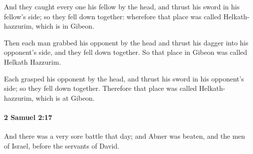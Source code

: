 			\begin{versebox}
					\item[BHS] 
					\item[ASV] And they caught every one his fellow by the head, and thrust his sword in his fellow's side; so they fell down together: wherefore that place was called Helkath-hazzurim, which is in Gibeon.
					\item[NIV] Then each man grabbed his opponent by the head and thrust his dagger into his opponent’s side, and they fell down together. So that place in Gibeon was called Helkath Hazzurim.
					\item[NRSV] Each grasped his opponent by the head, and thrust his sword in his opponent’s side; so they fell down together. Therefore that place was called Helkath-hazzurim, which is at Gibeon.
			\end{versebox}

		\paragraph{2 Samuel 2:17} %
			\label{2SAMUEL-2-17}

			And there was a very sore battle that day; and Abner was beaten, and the men of Israel, before the servants of David.

